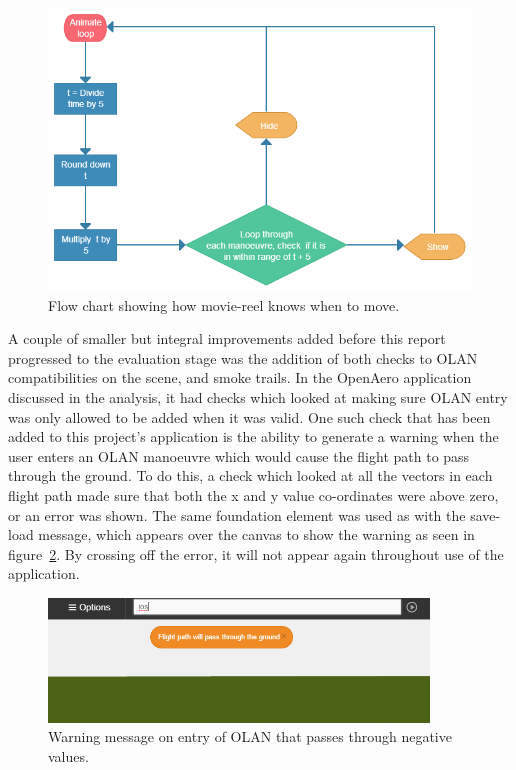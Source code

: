 \begin{figure}[h!]
	\centering
	\includegraphics[width=1\textwidth]{images/reel-flow.png}
	\caption{Flow chart showing how movie-reel knows when to move.}
	\label{fig:moves}
\end{figure}

A couple of smaller but integral improvements added before this report progressed to the evaluation stage was the addition of both checks to OLAN compatibilities on the scene, and smoke trails. In the OpenAero application discussed in the analysis, it had checks which looked at making sure OLAN entry was only allowed to be added when it was valid. One such check that has been added to this project's application is the ability to generate a warning when the user enters an OLAN manoeuvre which would cause the flight path to pass through the ground. To do this, a check which looked at all the vectors in each flight path made sure that both the x and y value co-ordinates were above zero, or an error was shown. The same foundation element was used as with the save-load message, which appears over the canvas to show the warning as seen in figure~\ref{fig:warnMan}. By crossing off the error, it will not appear again throughout use of the application.  

\begin{figure}[h!]
	\centering
	\includegraphics[width=0.9\textwidth]{images/warn.png}
	\caption{Warning message on entry of OLAN that passes through negative values.}
	\label{fig:warnMan}
\end{figure}


